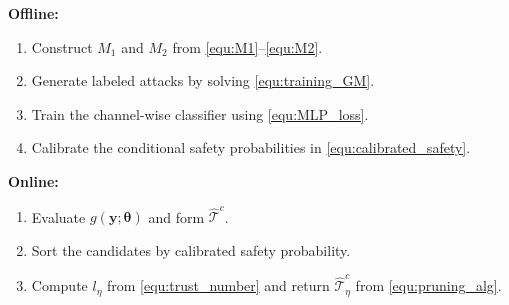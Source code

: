 \begin{algorithm}[h!]\label{Alg:ADL_AAG_P}
\SetAlgoLined
\textbf{Offline:}\\
\begin{enumerate}
\item Construct $M_1$ and $M_2$ from \eqref{equ:M1}--\eqref{equ:M2}.
\item Generate labeled attacks by solving \eqref{equ:training_GM}.
\item Train the channel-wise classifier using \eqref{equ:MLP_loss}.
\item Calibrate the conditional safety probabilities in \eqref{equ:calibrated_safety}.
\end{enumerate}
\textbf{Online:}\\
\begin{enumerate}
\item Evaluate $g(\mathbf{y};\boldsymbol{\theta})$ and form $\hat{\mathcal{T}}^c$.
\item Sort the candidates by calibrated safety probability.
\item Compute $l_\eta$ from \eqref{equ:trust_number} and return
$\hat{\mathcal{T}}_\eta^c$ from \eqref{equ:pruning_alg}.
\end{enumerate}
\caption{Attack localization and calibrated safe-set pruning}
\end{algorithm}
